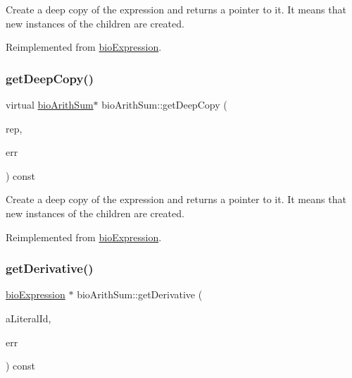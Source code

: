 Create a deep copy of the expression and returns a pointer to it. It means that new instances of the children are created. 

Reimplemented from \hyperlink{classbio_expression_a4ee1b8add634078a02eaae26cd40dcc8}{bio\+Expression}.

\mbox{\label{classbio_arith_sum_ab3264f5810c52c59b96ae72370e441ff}} 
\subsubsection{\texorpdfstring{get\+Deep\+Copy()}{getDeepCopy()}\hspace{0.1cm}{\footnotesize\ttfamily [4/4]}}
{\footnotesize\ttfamily virtual \hyperlink{classbio_arith_sum}{bio\+Arith\+Sum}$\ast$ bio\+Arith\+Sum\+::get\+Deep\+Copy (\begin{DoxyParamCaption}\item[{\hyperlink{classbio_expression_repository}{bio\+Expression\+Repository} $\ast$}]{rep,  }\item[{pat\+Error $\ast$\&}]{err }\end{DoxyParamCaption}) const\hspace{0.3cm}{\ttfamily [virtual]}}

Create a deep copy of the expression and returns a pointer to it. It means that new instances of the children are created. 

Reimplemented from \hyperlink{classbio_expression_a4ee1b8add634078a02eaae26cd40dcc8}{bio\+Expression}.

\mbox{\label{classbio_arith_sum_acefb2c0e91cdea5768b09aa17974c25e}} 
\subsubsection{\texorpdfstring{get\+Derivative()}{getDerivative()}\hspace{0.1cm}{\footnotesize\ttfamily [1/4]}}
{\footnotesize\ttfamily \hyperlink{classbio_expression}{bio\+Expression} $\ast$ bio\+Arith\+Sum\+::get\+Derivative (\begin{DoxyParamCaption}\item[{pat\+U\+Long}]{a\+Literal\+Id,  }\item[{pat\+Error $\ast$\&}]{err }\end{DoxyParamCaption}) const\hspace{0.3cm}{\ttfamily [virtual]}}


